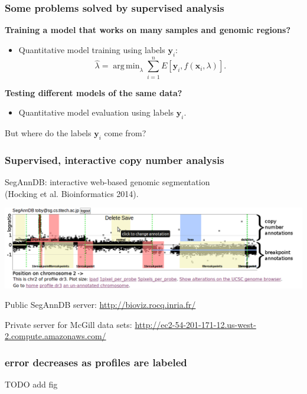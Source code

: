 \documentclass{beamer}
\DeclareMathOperator*{\argmin}{arg\,min}
\begin{document}
\begin{frame}
  \frametitle{Some problems solved by supervised analysis}
  \textbf{Training a model that works on many samples and genomic
    regions?} 
  \begin{itemize}
  \item Quantitative model training using labels $\mathbf y_i$:
  \begin{equation*}
    \hat \lambda = \argmin_{\lambda}
    \sum_{i=1}^n
    E\left[
      \mathbf y_i,
      f(\mathbf x_i, \lambda)
    \right].
  \end{equation*}
  \end{itemize}
  \textbf{Testing different models of the same data?} 
  \begin{itemize}
  \item Quantitative model evaluation using labels $\mathbf y_i$.
  \end{itemize}
  But where do the labels $\mathbf y_i$ come from?
\end{frame}

\begin{frame}
  \frametitle{Supervised, interactive copy number analysis}

  SegAnnDB: interactive web-based genomic segmentation\\
  (Hocking et al. Bioinformatics 2014).
  \begin{center}
\includegraphics[width=\textwidth]{new-new-annotations}
  \end{center}
\vskip 0.2in
Public SegAnnDB server: \url{http://bioviz.rocq.inria.fr/}

\vskip 0.1in
Private server for McGill data sets:
\small
\url{http://ec2-54-201-171-12.us-west-2.compute.amazonaws.com/}

\end{frame}

\begin{frame}
  \frametitle{error decreases as profiles are labeled}
  TODO add fig
\end{frame}
\end{document}
